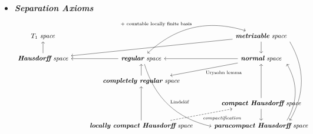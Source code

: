\documentclass[11pt]{article}
\begin{document}
\begin{itemize}
\item \emph{\textbf{Separation Axioms}}
\[
  \begin{tikzcd}
   \text{\emph{\textbf{$T_1$} space}}  & &\arrow{lld}{} \text{\emph{\textbf{metrizable} space}} \arrow{d}{} \arrow[dddd, shift left = 9ex, bend left, ""]  \\
   \arrow{u}{} \text{\emph{\textbf{Hausdorff} space}} &\arrow{l}{} \text{\emph{\textbf{regular} space}} \arrow[ur, leftrightarrow, bend left, "\text{ $+$ countable locally finite basis}"] \arrow[dddr,  bend right,"\text{Lindel\"of}"] &\arrow{l}{} \arrow{dl}{\text{Urysohn lemma}} \text{\emph{\textbf{normal} space}}  \\
  &  \arrow{u}{} \text{\emph{\textbf{completely regular} space}}   &  \\
   & &  \text{\emph{\textbf{compact Hausdorff} space}} \arrow{uu}{} \arrow{d}{} \\
   & \text{\emph{\textbf{locally compact Hausdorff} space}} \arrow{uu}{}  \arrow[dashed, swap]{ur}{\text{\emph{compactification}}} & \text{\emph{\textbf{paracompact Hausdorff} space}} \arrow[bend right, shift right = 8ex]{uuu}{}
  \end{tikzcd}
\] 
\end{itemize}


\newpage
\end{document}
